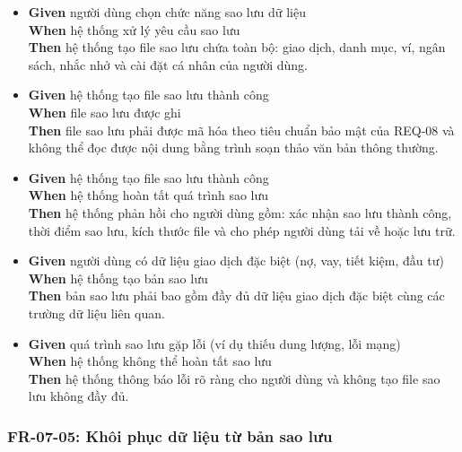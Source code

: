 \begin{itemize}
\item \textbf{Given} người dùng chọn chức năng sao lưu dữ liệu  \\ \hspace*{1.5em}  \textbf{When} hệ thống xử lý yêu cầu sao lưu  \\ \hspace*{1.5em}  \textbf{Then} hệ thống tạo file sao lưu chứa toàn bộ: giao dịch, danh mục, ví, ngân sách, nhắc nhở và cài đặt cá nhân của người dùng.
\item \textbf{Given} hệ thống tạo file sao lưu thành công  \\ \hspace*{1.5em}  \textbf{When} file sao lưu được ghi  \\ \hspace*{1.5em}  \textbf{Then} file sao lưu phải được mã hóa theo tiêu chuẩn bảo mật của REQ-08 và không thể đọc được nội dung bằng trình soạn thảo văn bản thông thường.
\item \textbf{Given} hệ thống tạo file sao lưu thành công  \\ \hspace*{1.5em}  \textbf{When} hệ thống hoàn tất quá trình sao lưu  \\ \hspace*{1.5em}  \textbf{Then} hệ thống phản hồi cho người dùng gồm: xác nhận sao lưu thành công, thời điểm sao lưu, kích thước file và cho phép người dùng tải về hoặc lưu trữ.
\item \textbf{Given} người dùng có dữ liệu giao dịch đặc biệt (nợ, vay, tiết kiệm, đầu tư)  \\ \hspace*{1.5em}  \textbf{When} hệ thống tạo bản sao lưu  \\ \hspace*{1.5em}  \textbf{Then} bản sao lưu phải bao gồm đầy đủ dữ liệu giao dịch đặc biệt cùng các trường dữ liệu liên quan.
\item \textbf{Given} quá trình sao lưu gặp lỗi (ví dụ thiếu dung lượng, lỗi mạng)  \\ \hspace*{1.5em}  \textbf{When} hệ thống không thể hoàn tất sao lưu  \\ \hspace*{1.5em}  \textbf{Then} hệ thống thông báo lỗi rõ ràng cho người dùng và không tạo file sao lưu không đầy đủ.
\end{itemize}
\subsubsection{FR-07-05: Khôi phục dữ liệu từ bản sao lưu}

